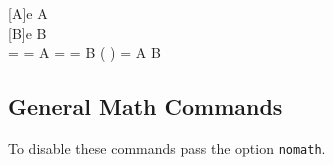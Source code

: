 \documentclass[leqno,11pt]{amsart}
\begin{document}
\begin{requirements}
[A]{e} A \neq {} \\
[B]{e} B \neq {} \\
  =  \land {} = A \land  {} =  \land {} = B \implies \Gamma( \symdiff {}) = A \Tplus B 
\end{requirements}




\subsection{General Math Commands}
To disable these commands pass the option \verb=nomath=. \\
\end{document}
